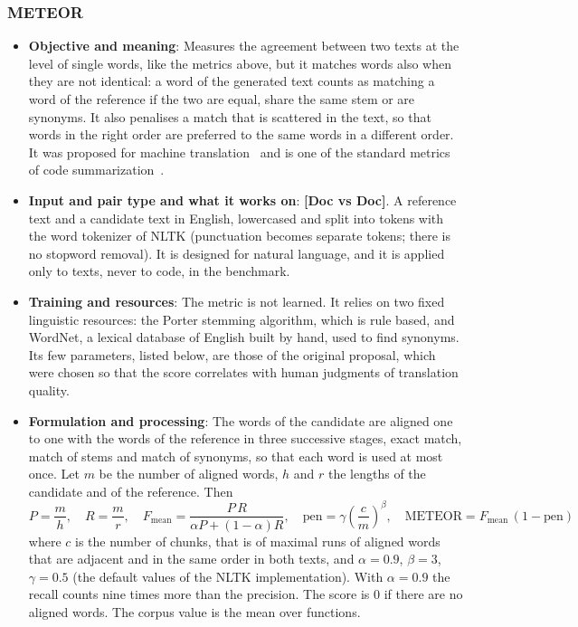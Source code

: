 \subsubsection{METEOR}
\label{subsubsec:meteor}
\begin{itemize}[leftmargin=*, label=\textbullet]
	\item \textbf{Objective and meaning}: Measures the agreement between two texts at the level of
	single words, like the metrics above, but it matches words also when they are not identical: a
	word of the generated text counts as matching a word of the reference if the two are equal, share
	the same stem or are synonyms. It also penalises a match that is scattered in the text, so that
	words in the right order are preferred to the same words in a different order. It was proposed
	for machine translation~\cite{banerjee_meteor_2005} and is one of the standard metrics of code
	summarization~\cite{wu_can_2024, xu_prompt_2024, geng_large_2023}.

	\item \textbf{Input and pair type and what it works on}: \textbf{[Doc vs Doc]}. A reference text
	and a candidate text in English, lowercased and split into tokens with the word tokenizer of NLTK
	(punctuation becomes separate tokens; there is no stopword removal). It is designed for natural
	language, and it is applied only to texts, never to code, in the benchmark.

	\item \textbf{Training and resources}: The metric is not learned. It relies on two fixed
	linguistic resources: the Porter stemming algorithm, which is rule based, and WordNet, a
	lexical database of English built by hand, used to find synonyms. Its few parameters, listed
	below, are those of the original proposal, which were chosen so that the score correlates with
	human judgments of translation quality.

	\item \textbf{Formulation and processing}: The words of the candidate are aligned one to one with
	the words of the reference in three successive stages, exact match, match of stems and match of
	synonyms, so that each word is used at most once. Let $m$ be the number of aligned words, $h$ and
	$r$ the lengths of the candidate and of the reference. Then
	\begin{equation}
		P=\frac{m}{h},\quad R=\frac{m}{r},\quad
		F_{\mathrm{mean}}=\frac{P\,R}{\alpha P+(1-\alpha)R},\quad
		\mathrm{pen}=\gamma\left(\frac{c}{m}\right)^{\beta},\quad
		\text{METEOR}=F_{\mathrm{mean}}\,(1-\mathrm{pen})
		\label{eq:meteor}
	\end{equation}
	where $c$ is the number of chunks, that is of maximal runs of aligned words that are adjacent and
	in the same order in both texts, and $\alpha=0.9$, $\beta=3$, $\gamma=0.5$ (the default values of
	the NLTK implementation). With $\alpha=0.9$ the recall counts nine times more than the precision.
	The score is $0$ if there are no aligned words. The corpus value is the mean over functions.


\end{itemize}
